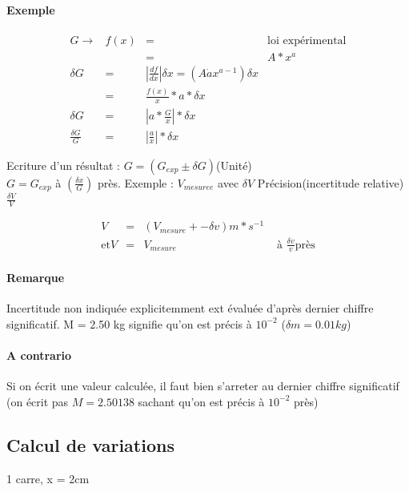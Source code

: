 \paragraph{Exemple}
\[\begin{array}{rccl}
	G \rightarrow & f(x) & = & \text{loi expérimental} \\
				  &  & = &A*x^a \\
	\delta G & = & |\frac{df}{dx}|\delta x = (A \dot ax^{a-1}) \delta x \\
							   & = & \frac{f(x)}{x} * a * \delta x\\
	\delta G & = & |a*\frac{G}{x}| * \delta x \\
	\frac{\delta G}{G} & = & |\frac{a}{x}| * \delta x
\end{array}\]

Ecriture d'un résultat : $G = (G_{exp} \pm \delta G)$(Unité) ~\\
$G = G_{exp} $ à $(\frac{\delta x}{G})$ près.
Exemple :
$V_{mesuree}$ avec $\delta V $
Précision(incertitude relative) $\frac{\delta V}{V}$

\[\begin{array}{rclr}
	V & = & (V_{mesure} +- \delta v) m * s^{-1} \\
		\text{et} V & = & V_{mesure} & \text{ à } \frac{\delta v}{v} \text{près}
\end{array}\]

\paragraph{Remarque}
Incertitude non indiquée explicitemment ext évaluée d'après dernier chiffre significatif.
M = 2.50 kg signifie qu'on est précis à $10^{-2}$ ($\delta m = 0.01 kg$)

\paragraph{A contrario} Si on écrit une valeur calculée, il faut bien s'arreter au dernier chiffre significatif (on écrit pas $M=2.50138$ sachant qu'on est précis à $10^{-2}$ près)

\subsection{Calcul de variations}

1 carre, x = 2cm 

